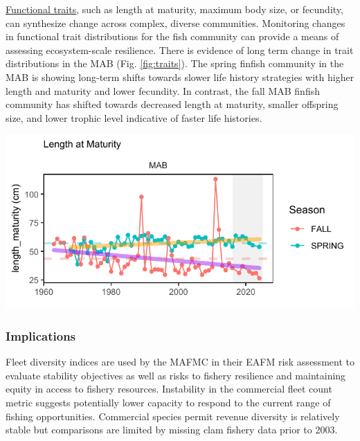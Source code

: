 \documentclass[
  10pt,
]{article}
\let\origfigure\figure
\let\endorigfigure\endfigure
\renewenvironment{figure}[1][2] {
    \expandafter\origfigure\expandafter[H]
} {
    \endorigfigure
}
\begin{document}
\href{https://noaa-edab.github.io/catalog/finfish_traits.html}{Functional traits}, such as length at maturity, maximum body size, or fecundity, can synthesize change across complex, diverse communities. Monitoring changes in functional trait distributions for the fish community can provide a means of assessing ecosystem-scale resilience. There is evidence of long term change in trait distributions in the MAB (Fig. \ref{fig:traits}). The spring finfish community in the MAB is showing long-term shifts towards slower life history strategies with higher length and maturity and lower fecundity. In contrast, the fall MAB finfish community has shifted towards decreased length at maturity, smaller offspring size, and lower trophic level indicative of faster life histories.

\begin{figure}

{\centering \includegraphics{midatlantic_files/figure-latex/traits-1} 

}

\caption{Fish community functional traits in the Mid Atlantic Bight based on Fall (red) and Spring (blue) survey data. Length at maturity for the full finfish community has increased in spring (orange line), but decreased in fall (purple lines)}\label{fig:traits}
\end{figure}

\subsubsection{Implications}\label{implications-3}

Fleet diversity indices are used by the MAFMC in their EAFM risk assessment to evaluate stability objectives as well as risks to fishery resilience and maintaining equity in access to fishery resources. Instability in the commercial fleet count metric suggests potentially lower capacity to respond to the current range of fishing opportunities. Commercial species permit revenue diversity is relatively stable but comparisons are limited by missing clam fishery data prior to 2003.
\end{document}

